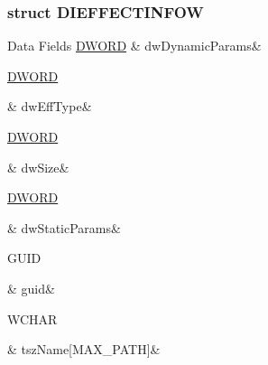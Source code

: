 \subsubsection{struct D\-I\-E\-F\-F\-E\-C\-T\-I\-N\-F\-O\-W}
\begin{DoxyFields}{Data Fields}
\hypertarget{a00003_a5960d079753d3d096fda2e06cde63909}{\hyperlink{a00003_a50e15ae51c87ae06ab29c8148cb5f36c}{D\-W\-O\-R\-D}}\label{a00003_a5960d079753d3d096fda2e06cde63909}
&
dw\-Dynamic\-Params&
\\
\hline

\hypertarget{a00003_a86d5a8965ff03b83984c7906513d9efc}{\hyperlink{a00003_a50e15ae51c87ae06ab29c8148cb5f36c}{D\-W\-O\-R\-D}}\label{a00003_a86d5a8965ff03b83984c7906513d9efc}
&
dw\-Eff\-Type&
\\
\hline

\hypertarget{a00003_a669c5a85f5a9eb97e64ad880fadaaa2d}{\hyperlink{a00003_a50e15ae51c87ae06ab29c8148cb5f36c}{D\-W\-O\-R\-D}}\label{a00003_a669c5a85f5a9eb97e64ad880fadaaa2d}
&
dw\-Size&
\\
\hline

\hypertarget{a00003_ac14d49a005b6a47ff12cfa947c1bc413}{\hyperlink{a00003_a50e15ae51c87ae06ab29c8148cb5f36c}{D\-W\-O\-R\-D}}\label{a00003_ac14d49a005b6a47ff12cfa947c1bc413}
&
dw\-Static\-Params&
\\
\hline

\hypertarget{a00003_a251f3e458e214b6e3ffde1171e658f78}{G\-U\-I\-D}\label{a00003_a251f3e458e214b6e3ffde1171e658f78}
&
guid&
\\
\hline

\hypertarget{a00003_a63701bade4cd23a8246a900ec69342c6}{W\-C\-H\-A\-R}\label{a00003_a63701bade4cd23a8246a900ec69342c6}
&
tsz\-Name\mbox{[}M\-A\-X\-\_\-\-P\-A\-T\-H\mbox{]}&
\\
\hline

\end{DoxyFields}
\label{da/d2a/a00086}
\hypertarget{a00003_da/d2a/a00086}{}
